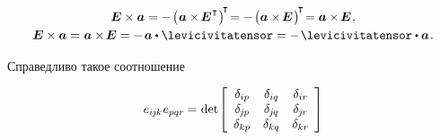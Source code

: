 \begin{otherlanguage}{russian}
\nopagebreak\vspace{-0.25em}\begin{equation}\begin{array}{c}
\UnitDyad \times \bm{a}
= - \hspace{.25ex} \bigl( \hspace{.1ex} \bm{a} \times \hspace{-0.25ex} \UnitDyad^{\hspace{.1ex}\T} \hspace{.1ex} \bigr)^{\hspace{-0.3ex}\T} \hspace{-0.4ex}
= - \hspace{.25ex} \bigl( \bm{a} \times \hspace{-0.25ex} \UnitDyad \hspace{.15ex} \bigr)^{\hspace{-0.25ex}\T} \hspace{-0.4ex}
= \bm{a} \times \hspace{-0.25ex} \UnitDyad
\hspace{.15ex} ,
\\[.25em]
%
\UnitDyad \times \bm{a} = \hspace{.1ex} \bm{a} \times \hspace{-0.25ex} \UnitDyad
= - \hspace{.25ex} \bm{a} \dotp \levicivitatensor
= - \hspace{.2ex} \levicivitatensor \dotp \bm{a}
\hspace{.2ex} .
\end{array}\end{equation}

Справедливо такое соотношение

\nopagebreak\vspace{-0.1em}\begin{equation}\label{doubleveblen}
e_{i\hspace{-0.1ex}j\hspace{-0.1ex}k} \hspace{.1ex} e_{pqr}
\hspace{-0.1ex} = \hspace{.1ex}
\operatorname{det} \hspace{-0.25ex} \left[
\begin{array}{ccc}
\delta_{ip} & \delta_{iq} & \delta_{ir} \\
\delta_{\hspace{-0.1ex}j\hspace{-0.1ex}p} & \delta_{\hspace{-0.1ex}j\hspace{-0.1ex}q} & \delta_{\hspace{-0.1ex}j\hspace{-0.1ex}r} \\
\delta_{kp} & \delta_{kq} & \delta_{kr}
\end{array}\hspace{-0.1ex}
\right]
\end{equation}


\end{otherlanguage}
